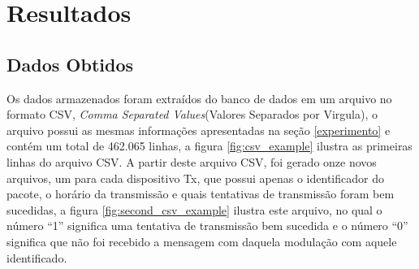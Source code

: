 \chapter{Resultados}
\label{resultados}

\section{Dados Obtidos}
Os dados armazenados foram extraídos do banco de dados em um arquivo no formato CSV, \emph{Comma Separated Values}(Valores Separados por Virgula), o arquivo possui as mesmas informações apresentadas na seção \ref{experimento} e contém um total de 462.065 linhas, a figura \ref{fig:csv_example} ilustra as primeiras linhas do arquivo CSV. A partir deste arquivo CSV, foi gerado onze novos arquivos, um para cada dispositivo Tx, que possui apenas o identificador do pacote, o horário da transmissão e quais tentativas de transmissão foram bem sucedidas, a figura \ref{fig:second_csv_example} ilustra este arquivo, no qual o número ``1'' significa uma tentativa de transmissão bem sucedida e o número ``0'' significa que não foi recebido a mensagem com daquela modulação com aquele identificado.


